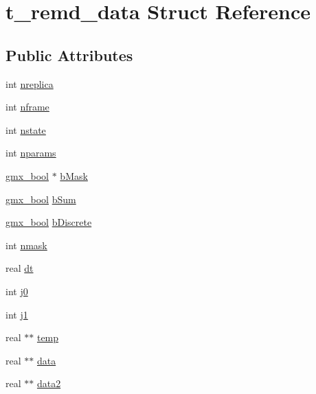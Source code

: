 \hypertarget{structt__remd__data}{\section{t\-\_\-remd\-\_\-data \-Struct \-Reference}
\label{structt__remd__data}
}
\subsection*{\-Public \-Attributes}
\begin{DoxyCompactItemize}
\item 
int \hyperlink{structt__remd__data_a12aacf46a8abd9c86d9db35ce3e0e70b}{nreplica}
\item 
int \hyperlink{structt__remd__data_a7f42b93b7f20391e4b1cbead78387732}{nframe}
\item 
int \hyperlink{structt__remd__data_aca8bedd7972ee065ec948f0dee9de954}{nstate}
\item 
int \hyperlink{structt__remd__data_a3180bdb7cc6be7e23ca7ef85c290a4a6}{nparams}
\item 
\hyperlink{include_2types_2simple_8h_a8fddad319f226e856400d190198d5151}{gmx\-\_\-bool} $\ast$ \hyperlink{structt__remd__data_a3a52ea208a6507f57f5d792e2557d4f1}{b\-Mask}
\item 
\hyperlink{include_2types_2simple_8h_a8fddad319f226e856400d190198d5151}{gmx\-\_\-bool} \hyperlink{structt__remd__data_a517a574c8134f9b96f86e93d03499d86}{b\-Sum}
\item 
\hyperlink{include_2types_2simple_8h_a8fddad319f226e856400d190198d5151}{gmx\-\_\-bool} \hyperlink{structt__remd__data_a45834036c12bbfa2c9b8e0ae1f8bfe0f}{b\-Discrete}
\item 
int \hyperlink{structt__remd__data_a11114c2e69624e734f6931ae0818f46e}{nmask}
\item 
real \hyperlink{structt__remd__data_a609e6638cdc4c033577ce145bbbc986f}{dt}
\item 
int \hyperlink{structt__remd__data_add214a1dec1e4b91a4687a44ab368a4b}{j0}
\item 
int \hyperlink{structt__remd__data_a927cd46e34ef35d5088f33e56e94563e}{j1}
\item 
real $\ast$$\ast$ \hyperlink{structt__remd__data_a4d4e5efd43786e5380b68e4ada72ad68}{temp}
\item 
real $\ast$$\ast$ \hyperlink{structt__remd__data_acc6c2357b1139b6fff339e819c70fcb9}{data}
\item 
real $\ast$$\ast$ \hyperlink{structt__remd__data_a8c505c5904fb156e2c86f56c996c6df1}{data2}
$$
\end{DoxyCompactItemize}
